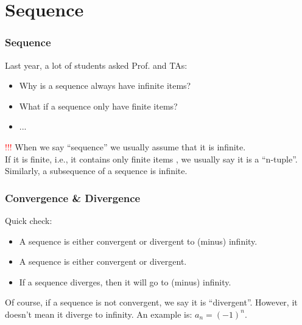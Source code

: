 \documentclass{beamer}
\begin{document}
\section{Sequence}
\begin{frame}
    \frametitle{Sequence}
    Last year, a lot of students asked Prof. and TAs:
    \begin{itemize}
        \item Why is a sequence always have infinite items?
        \item What if a sequence only have finite items?
        \item ...
    \end{itemize}
    \pause
    
    \textcolor{red}{!!!}
	When we say “sequence” we usually assume that it is infinite.\\ 
    If it is finite, i.e., it contains only finite items
    , we usually say it is a “n-tuple”.
    Similarly, a subsequence of a sequence is infinite. 

\end{frame}
\begin{frame}
    \frametitle{Convergence \& Divergence}
    \begin{block}{Quick check:}
        \hspace{1em}
        \begin{itemize}
            \item A sequence is either convergent or divergent to (minus) infinity.
            \item A sequence is either convergent or divergent.
            \item If a sequence diverges, then it will go to (minus) infinity.
        \end{itemize}

    \end{block}
    \pause
    \hspace{1em}
    Of course, if a sequence is not convergent, 
    we say it is “divergent”. 
    However, it doesn’t mean it diverge to infinity. 
    An example is: $a_n=(-1)^n$. 

\end{frame}
\end{document}
